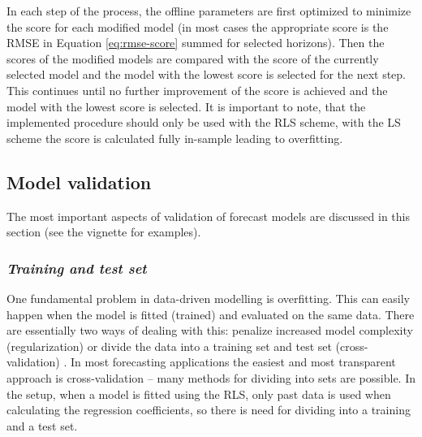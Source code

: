 In each step of the process, the offline parameters are first optimized to
minimize the score for each modified model (in most cases the appropriate score
is the RMSE in Equation \eqref{eq:rmse-score} summed for selected horizons). Then the scores of the modified
models are compared with the score of the currently selected model and the model
with the lowest score is selected for the next step. This continues until no
further improvement of the score is achieved and the model with the lowest score is
selected. It is important to note, that the implemented procedure should only
be used with the RLS scheme, with the LS scheme the score is calculated fully
in-sample leading to overfitting.



\subsection{Model validation}

The most important aspects of validation of forecast models are discussed in
this section (see the  vignette for examples).

\subsubsection{\it Training and test set}

One fundamental problem in data-driven modelling is overfitting. This
can easily happen when the model is fitted (trained) and evaluated on the same
data. There are essentially two ways of dealing with this: penalize increased
model complexity (regularization) or divide the data into a training set and
test set (cross-validation) \citep{tashman2000out}. In most forecasting applications the easiest and most transparent approach is
cross-validation -- many methods for dividing into sets are possible. In
the \onlineforecast setup, when a model is fitted using the RLS, only past data is used when calculating the regression
coefficients, so there is  need for dividing into a training and a test
set.

